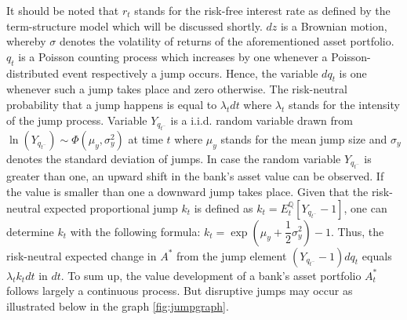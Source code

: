 It should be noted that $r_t$ stands for the risk-free interest rate as defined by the \citet{cox1985theory} term-structure model which will be discussed shortly. $dz$ is a Brownian motion, whereby $\sigma$ denotes the volatility of returns of the aforementioned asset portfolio. $q_t$ is a Poisson counting process which increases by one whenever a Poisson-distributed event respectively a jump occurs. Hence, the variable $dq_t$ is one whenever such a jump takes place and zero otherwise. The risk-neutral probability that a jump happens is equal to $\lambda_t dt$ where $\lambda_t$ stands for the intensity of the jump process. Variable $Y_{q_{t^{-}}}$ is a i.i.d. random variable drawn from $\ln(Y_{q_{t^{-}}}) \sim \Phi\left(\mu_{y}, \sigma^2_{y}\right)$ at time $t$ where $\mu_{y}$ stands for the mean jump size and $\sigma_{y}$ denotes the standard deviation of jumps. In case the random variable $Y_{q_{t^{-}}}$ is greater than one, an upward shift in the bank's asset value can be observed. If the value is smaller than one a downward jump takes place. Given that the risk-neutral expected proportional jump $k_t$ is defined as $k_t = E^\mathbb{Q}_t\left[ Y_{q_{t^{-}}} - 1 \right]$, one can determine $k_t$ with the following formula: $k_t = \exp(\mu_{y}+\dfrac{1}{2}\sigma_y^2) - 1$. Thus, the risk-neutral expected change in $A^*$ from the jump element $(Y_{q_{t^{-}}}-1)dq_t$ equals $\lambda_t k_t dt$ in $dt$. To sum up, the value development of a bank's asset portfolio $A_t^*$ follows largely a continuous process. But disruptive jumps may occur as illustrated below in the graph \ref{fig:jumpgraph}.\\
